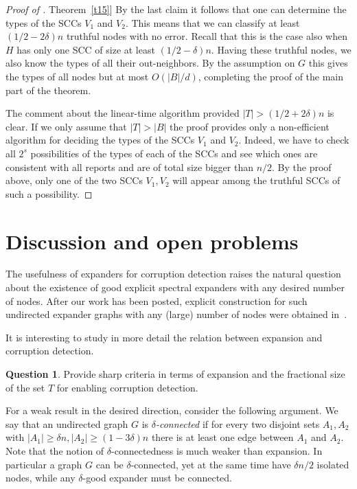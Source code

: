 \documentclass[11pt]{article}
\numberwithin{equation}{section}
\theoremstyle{definition}
\newtheorem{question}[theorem]{Question}
\theoremstyle{plain}
\newcommand{\expref}[2]{\hyperref[#2]{#1~\ref{#2}}}
\begin{document}
\begin{proof}[Proof of \expref{Theorem}{t15}]
By the last claim it follows that one can determine the types of
the SCCs $V_1$ and $V_2$. This means that we can classify
at least $(1/2-2 \delta)n$ truthful nodes with no error. Recall
that this is
the case also when $H$ has only one SCC of size
at least $(1/2-\delta)n$. Having these truthful nodes, we also
know the types of all their out-neighbors. By the assumption on $G$
this gives the types of all nodes but at most $O(|B|/d)$,
completing the proof of the main part of the theorem.  
\vspace{0.1cm}

\noindent
The comment about the
%
linear-time   %
algorithm provided $|T|>(1/2+2\delta)n$
is clear. If we only assume that $|T|>|B|$ the proof
provides only a non-efficient algorithm  for deciding the types of
the SCCs $V_1$ and $V_2$. Indeed, we have to check
all $2^s$ possibilities of the types of each of the SCCs and see
which ones are consistent with all reports and are of total size
bigger than $n/2$.
By the proof above, only one of the two SCCs $V_1,V_2$ will appear 
among the truthful SCCs of such a possibility.
%
\end{proof}   %

\section{Discussion and open problems}
\label{sec:open}

The usefulness of expanders for corruption detection raises 
the natural question about the existence of good explicit 
spectral expanders with any desired number of nodes. 
After our work has been posted, explicit construction for 
such undirected expander graphs with any (large) 
%
number of nodes were 
obtained in~\cite{A19}. 

It is interesting to study in more detail the relation
between expansion and corruption detection.

\begin{question}
Provide sharp criteria in terms of expansion and the fractional 
size of the set $T$ for enabling corruption detection.
\end{question} 

%
%
%
For a weak result in the desired direction,  %
consider the following argument.
We say that an undirected  graph $G$ is \emph{$\delta$-connected}
 if for every two disjoint sets
$A_1, A_2$ with $|A_1| \geq \delta n, | A_2 | \geq (1- 3 \delta) n$
there is at least one edge between $A_1$ and $A_2$. Note that the notion
of
%
$\delta$-connectedness   %
is much weaker than expansion.  In particular a graph
$G$ can be
%
$\delta$-connected,    %
yet at the same time have $\delta n/2 $
isolated nodes, while any $\delta$-good expander must be connected.
\end{document}
